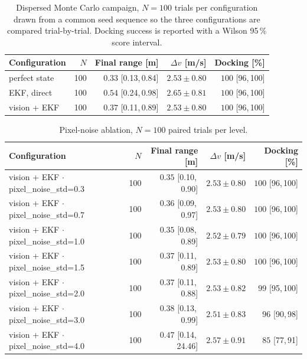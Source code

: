 \begin{table}[t]
\centering
\caption{Dispersed Monte Carlo campaign, $N = 100$ trials per configuration drawn from a common seed sequence so the three configurations are compared trial-by-trial. Docking success is reported with a Wilson 95\,\% score interval.}
\label{tab:mc_configs}
\begin{tabular}{lrrrr}
\toprule
Configuration & $N$ & Final range [m] & $\Delta v$ [m/s] & Docking [\%] \\
\midrule
perfect state & 100 & $0.33$ [0.13,\,0.84] & $2.53 \pm 0.80$ & $100$ [96,\,100] \\
EKF, direct & 100 & $0.54$ [0.24,\,0.98] & $2.65 \pm 0.81$ & $100$ [96,\,100] \\
vision + EKF & 100 & $0.37$ [0.11,\,0.89] & $2.53 \pm 0.80$ & $100$ [96,\,100] \\
\bottomrule
\end{tabular}
\end{table}

\begin{table}[t]
\centering
\caption{Pixel-noise ablation, $N = 100$ paired trials per level.}
\label{tab:mc_noise}
\begin{tabular}{lrrrr}
\toprule
Configuration & $N$ & Final range [m] & $\Delta v$ [m/s] & Docking [\%] \\
\midrule
vision + EKF $\cdot$ pixel\_noise\_std=0.3 & 100 & $0.35$ [0.10,\,0.90] & $2.53 \pm 0.80$ & $100$ [96,\,100] \\
vision + EKF $\cdot$ pixel\_noise\_std=0.7 & 100 & $0.36$ [0.09,\,0.97] & $2.53 \pm 0.80$ & $100$ [96,\,100] \\
vision + EKF $\cdot$ pixel\_noise\_std=1.0 & 100 & $0.35$ [0.08,\,0.89] & $2.52 \pm 0.79$ & $100$ [96,\,100] \\
vision + EKF $\cdot$ pixel\_noise\_std=1.5 & 100 & $0.37$ [0.11,\,0.89] & $2.53 \pm 0.80$ & $100$ [96,\,100] \\
vision + EKF $\cdot$ pixel\_noise\_std=2.0 & 100 & $0.37$ [0.11,\,0.88] & $2.53 \pm 0.82$ & $99$ [95,\,100] \\
vision + EKF $\cdot$ pixel\_noise\_std=3.0 & 100 & $0.38$ [0.13,\,0.99] & $2.51 \pm 0.83$ & $96$ [90,\,98] \\
vision + EKF $\cdot$ pixel\_noise\_std=4.0 & 100 & $0.47$ [0.14,\,24.46] & $2.57 \pm 0.91$ & $85$ [77,\,91] \\
\bottomrule
\end{tabular}
\end{table}